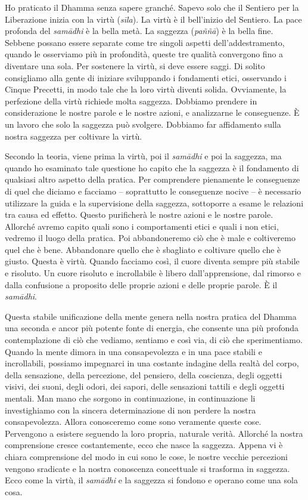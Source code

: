 Ho praticato il Dhamma senza sapere granché. Sapevo solo che il Sentiero
per la Liberazione inizia con la virtù (\emph{sīla}). La virtù è il
bell'inizio del Sentiero. La pace profonda del \emph{samādhi} è la bella
metà. La saggezza (\emph{paññā}) è la bella fine. Sebbene possano essere
separate come tre singoli aspetti dell'addestramento, quando le
osserviamo più in profondità, queste tre qualità convergono fino a
diventare una sola. Per sostenere la virtù, si deve essere saggi. Di
solito consigliamo alla gente di iniziare sviluppando i fondamenti
etici, osservando i Cinque Precetti, in modo tale che la loro virtù
diventi solida. Ovviamente, la perfezione della virtù richiede molta
saggezza. Dobbiamo prendere in considerazione le nostre parole e le
nostre azioni, e analizzarne le conseguenze. È un lavoro che solo la
saggezza può svolgere. Dobbiamo far affidamento sulla nostra saggezza
per coltivare la virtù.

Secondo la teoria, viene prima la virtù, poi il \emph{samādhi} e poi la
saggezza, ma quando ho esaminato tale questione ho capito che la
saggezza è il fondamento di qualsiasi altro aspetto della pratica. Per
comprendere pienamente le conseguenze di quel che diciamo e facciamo --
soprattutto le conseguenze nocive -- è necessario utilizzare la guida e
la supervisione della saggezza, sottoporre a esame le relazioni tra
causa ed effetto. Questo purificherà le nostre azioni e le nostre
parole. Allorché avremo capito quali sono i comportamenti etici e quali
i non etici, vedremo il luogo della pratica. Poi abbandoneremo ciò che è
male e coltiveremo quel che è bene. Abbandonare quello che è sbagliato e
coltivare quello che è giusto. Questa è virtù. Quando facciamo così, il
cuore diventa sempre più stabile e risoluto. Un cuore risoluto e
incrollabile è libero dall'apprensione, dal rimorso e dalla confusione a
proposito delle proprie azioni e delle proprie parole. È il
\emph{samādhi}.

Questa stabile unificazione della mente genera nella nostra pratica del
Dhamma una seconda e ancor più potente fonte di energia, che consente
una più profonda contemplazione di ciò che vediamo, sentiamo e così via,
di ciò che sperimentiamo. Quando la mente dimora in una consapevolezza e
in una pace stabili e incrollabili, possiamo impegnarci in una costante
indagine della realtà del corpo, della sensazione, della percezione, del
pensiero, della coscienza, degli oggetti visivi, dei suoni, degli odori,
dei sapori, delle sensazioni tattili e degli oggetti mentali. Man mano
che sorgono in continuazione, in continuazione li investighiamo con la
sincera determinazione di non perdere la nostra consapevolezza. Allora
conosceremo come sono veramente queste cose. Pervengono a esistere
seguendo la loro propria, naturale verità. Allorché la nostra
comprensione cresce costantemente, ecco che nasce la saggezza. Appena vi
è chiara comprensione del modo in cui sono le cose, le nostre vecchie
percezioni vengono sradicate e la nostra conoscenza concettuale si
trasforma in saggezza. Ecco come la virtù, il \emph{samādhi} e la
saggezza si fondono e operano come una sola cosa.


